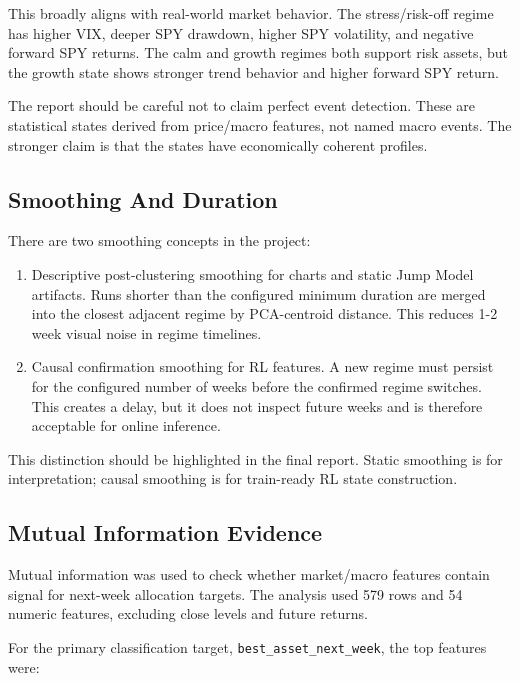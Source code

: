 This broadly aligns with real-world market behavior. The stress/risk-off
regime has higher VIX, deeper SPY drawdown, higher SPY volatility, and
negative forward SPY returns. The calm and growth regimes both support
risk assets, but the growth state shows stronger trend behavior and
higher forward SPY return.

The report should be careful not to claim perfect event detection. These
are statistical states derived from price/macro features, not named
macro events. The stronger claim is that the states have economically
coherent profiles.

\subsection{Smoothing And Duration}\label{smoothing-and-duration}

There are two smoothing concepts in the project:

\begin{enumerate}
\def\labelenumi{\arabic{enumi}.}
\tightlist
\item
  Descriptive post-clustering smoothing for charts and static Jump Model
  artifacts. Runs shorter than the configured minimum duration are
  merged into the closest adjacent regime by PCA-centroid distance. This
  reduces 1-2 week visual noise in regime timelines.
\item
  Causal confirmation smoothing for RL features. A new regime must
  persist for the configured number of weeks before the confirmed regime
  switches. This creates a delay, but it does not inspect future weeks
  and is therefore acceptable for online inference.
\end{enumerate}

This distinction should be highlighted in the final report. Static
smoothing is for interpretation; causal smoothing is for train-ready RL
state construction.

\subsection{Mutual Information
Evidence}\label{mutual-information-evidence}

Mutual information was used to check whether market/macro features
contain signal for next-week allocation targets. The analysis used 579
rows and 54 numeric features, excluding close levels and future returns.

For the primary classification target, \texttt{best\_asset\_next\_week},
the top features were:

